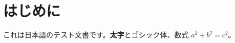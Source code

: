 \documentclass{ltjsarticle}
\begin{document}
\section{はじめに}
これは日本語のテスト文書です。\textbf{太字}と\textsf{ゴシック体}、数式 $a^2+b^2=c^2$。
\end{document}
